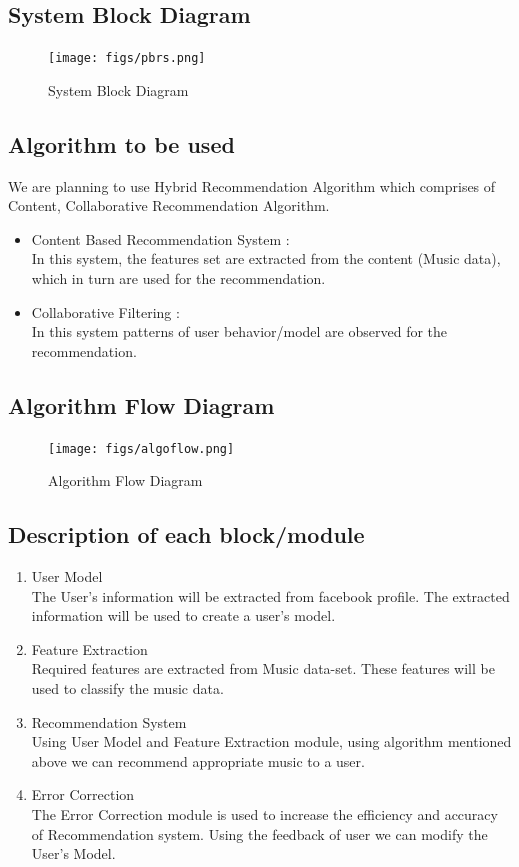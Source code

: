 \documentclass{article}
\begin{document}
\subsection{System Block Diagram}
\begin{figure}[ht!]
  \centering
  \texttt{[image: figs/pbrs.png]}
  \caption{System Block Diagram \label{fig:pbrs}}
\end{figure}

\subsection{Algorithm to be used}
We are planning to use Hybrid Recommendation Algorithm which comprises of Content, Collaborative Recommendation Algorithm.
\begin{itemize}
\item Content Based Recommendation System :\\
  In this system, the features set are extracted from the content (Music data), which in turn are used for the recommendation.
\item Collaborative Filtering :\\
  In this system patterns of user behavior/model are observed for the recommendation.
\end{itemize}
\cleardoublepage

\subsection{Algorithm Flow Diagram}
\begin{figure}[ht!]
  \centering
  \texttt{[image: figs/algoflow.png]}
  \caption{Algorithm Flow Diagram \label{fig:algoflow}}
\end{figure}

\subsection{Description of each block/module}

\begin{enumerate}
\item User Model\\
  The User's information will be extracted from facebook profile. The extracted information will be used to create a user's model.
\item Feature Extraction\\
  Required features are extracted from Music data-set. These features will be used to classify the music data.
\item Recommendation System\\
  Using User Model and Feature Extraction module, using algorithm mentioned above we can recommend appropriate music to a user.
\item Error Correction\\
  The Error Correction module is used to increase the efficiency and accuracy of Recommendation system. Using the feedback of user we can modify the User's Model.
\end{enumerate}
\cleardoublepage
\end{document}
